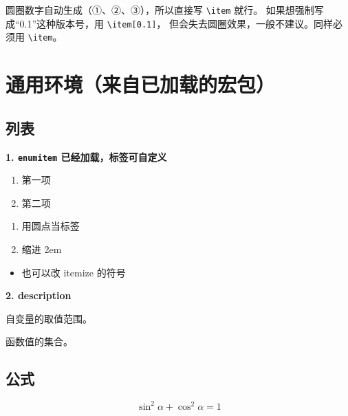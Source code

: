 \documentclass[lang=cn,newtx,10pt,scheme=chinese,nofont]{elegantbook}
\begin{document}
圆圈数字自动生成（①、②、③），所以直接写 \verb|\item| 就行。
如果想强制写成“0.1”这种版本号，用 \verb|\item[0.1]|，
但会失去圆圈效果，一般不建议。同样必须用 \verb|\item|。


\chapter{通用环境（来自已加载的宏包）}

\section{列表}

\textbf{1. \texttt{enumitem} 已经加载，标签可自定义}

\begin{enumerate}[(1)]
    \item 第一项
    \item 第二项
\end{enumerate}

\begin{enumerate}[label=$\bullet$, leftmargin=2em]
    \item 用圆点当标签
    \item 缩进 2em
\end{enumerate}

\begin{itemize}[label=$\triangleright$]
    \item 也可以改 itemize 的符号
\end{itemize}

\textbf{2. description}

\begin{description}[leftmargin=4em]
    \item[定义域] 自变量的取值范围。
    \item[值域] 函数值的集合。
\end{description}

\section{公式}

\begin{equation}
    \sin^2\alpha+\cos^2\alpha=1 \label{eq:pyth}
\end{equation}
\end{document}
